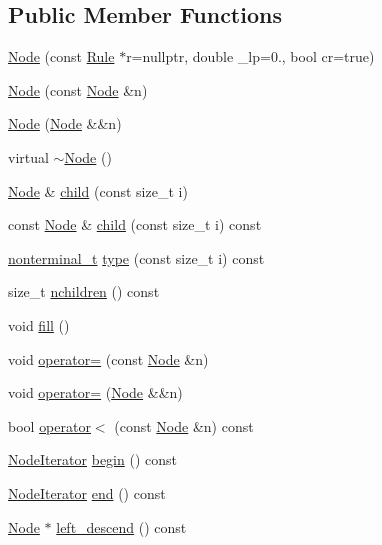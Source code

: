 \subsection*{Public Member Functions}
\begin{DoxyCompactItemize}
\item 
\hyperlink{class_node_ae33050869651f64551da2d13ad2a9dbc}{Node} (const \hyperlink{class_rule}{Rule} $\ast$r=nullptr, double \+\_\+lp=0., bool cr=true)
\item 
\hyperlink{class_node_a277918b68827f6ffd8150f450b0c12c3}{Node} (const \hyperlink{class_node}{Node} \&n)
\item 
\hyperlink{class_node_a87c9938dcd77c169802a732c98204945}{Node} (\hyperlink{class_node}{Node} \&\&n)
\item 
virtual \hyperlink{class_node_af5e3fa79300bf5f3f2f3ecae6e795a94}{$\sim$\+Node} ()
\item 
\hyperlink{class_node}{Node} \& \hyperlink{class_node_a23adfa03c20f4141b1105c5b4b1bca3f}{child} (const size\+\_\+t i)
\item 
const \hyperlink{class_node}{Node} \& \hyperlink{class_node_acc2b20cdba470853f1c137e26546ed3c}{child} (const size\+\_\+t i) const
\item 
\hyperlink{_nonterminal_8h_a5c1f658dc7560600a16d22408bd716ca}{nonterminal\+\_\+t} \hyperlink{class_node_aa727c354e38f60fb1560d72ae1aaa9af}{type} (const size\+\_\+t i) const
\item 
size\+\_\+t \hyperlink{class_node_a5d42219573573f6a91cdfe68fe415505}{nchildren} () const
\item 
void \hyperlink{class_node_a1c03973664fcfdfb191feb67f565168b}{fill} ()
\item 
void \hyperlink{class_node_addbfe90949f473c91203389f48095cf0}{operator=} (const \hyperlink{class_node}{Node} \&n)
\item 
void \hyperlink{class_node_abcd5c8ca2ea54716a72f7e27f9a9c937}{operator=} (\hyperlink{class_node}{Node} \&\&n)
\item 
bool \hyperlink{class_node_a8b05feb361beb04d465619751a2297b1}{operator$<$} (const \hyperlink{class_node}{Node} \&n) const
\item 
\hyperlink{class_node_1_1_node_iterator}{Node\+Iterator} \hyperlink{class_node_a319b65eca94c9438201ebda99ab90a65}{begin} () const
\item 
\hyperlink{class_node_1_1_node_iterator}{Node\+Iterator} \hyperlink{class_node_aea7c6e778d4720fb8071af71c57b1628}{end} () const
\item 
\hyperlink{class_node}{Node} $\ast$ \hyperlink{class_node_ac6d1a1d71a28168b34e9092568570738}{left\+\_\+descend} () const

\end{DoxyCompactItemize}
